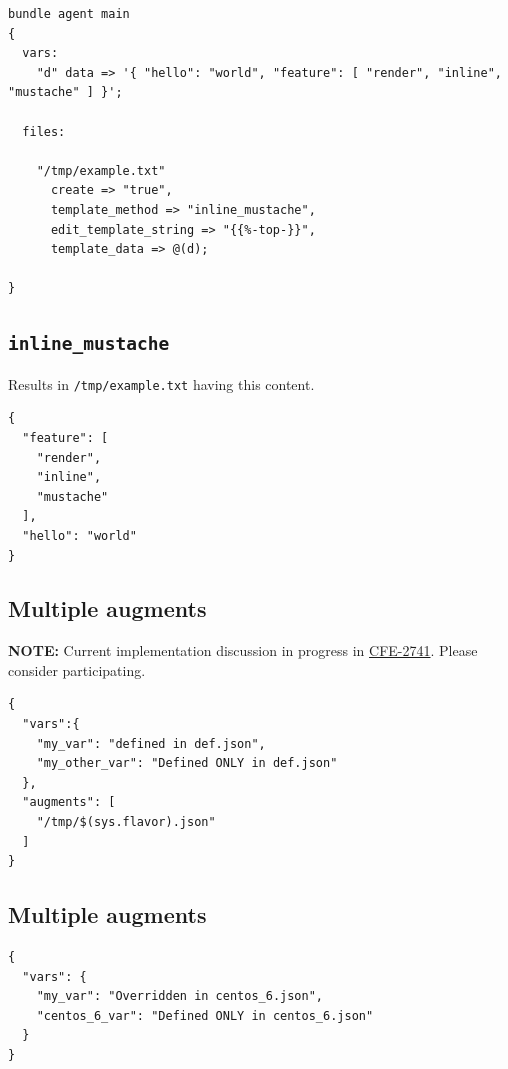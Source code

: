 \documentclass[11pt]{article}
\begin{document}
\begin{verbatim}
bundle agent main
{
  vars:
    "d" data => '{ "hello": "world", "feature": [ "render", "inline", "mustache" ] }';

  files:

    "/tmp/example.txt"
      create => "true",
      template_method => "inline_mustache",
      edit_template_string => "{{%-top-}}",
      template_data => @(d);

}
\end{verbatim}

\subsection*{\texttt{inline\_mustache}}
\label{sec:orgb5ccdb9}

Results in \texttt{/tmp/example.txt} having this content.

\begin{verbatim}
{
  "feature": [
    "render",
    "inline",
    "mustache"
  ],
  "hello": "world"
}
\end{verbatim}
\subsection*{Multiple augments}
\label{sec:org945c492}

\textbf{NOTE:} Current implementation discussion in progress in \href{https://tracker.mender.io/browse/CFE-2741}{CFE-2741}. Please
consider participating.

\begin{verbatim}
{
  "vars":{
    "my_var": "defined in def.json",
    "my_other_var": "Defined ONLY in def.json"
  },
  "augments": [
    "/tmp/$(sys.flavor).json"
  ]
}
\end{verbatim}

\subsection*{Multiple augments}
\label{sec:org052bdf0}

\begin{verbatim}
{
  "vars": {
    "my_var": "Overridden in centos_6.json",
    "centos_6_var": "Defined ONLY in centos_6.json"
  }
}
\end{verbatim}
\end{document}
